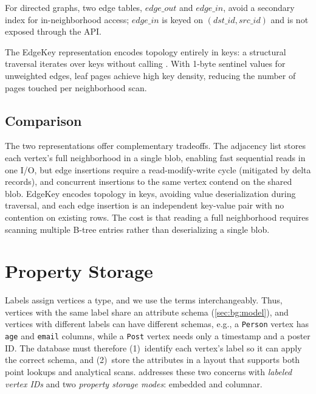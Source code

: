 For directed graphs, two edge tables, $edge\_out$ and $edge\_in$, avoid a secondary index for in-neighborhood access; $edge\_in$ is keyed on $(dst\_id, src\_id)$ and is not exposed through the API.


The EdgeKey representation encodes topology entirely in keys: a structural traversal iterates over keys without calling .
With 1-byte sentinel values for unweighted edges, leaf pages achieve high key density, reducing the number of pages touched per neighborhood scan.



\subsection{Comparison}
The two representations offer complementary tradeoffs.
The adjacency list stores each vertex's full neighborhood in a single blob, enabling fast sequential reads in one I/O, but edge insertions require a read-modify-write cycle (mitigated by  delta records), and concurrent insertions to the same vertex contend on the shared blob.
EdgeKey encodes topology in keys, avoiding value deserialization during traversal, and each edge insertion is an independent key-value pair with no contention on existing rows.
The cost is that reading a full neighborhood requires scanning multiple B-tree entries rather than deserializing a single blob.



\section{Property Storage}
\label{arch:property-storage}
Labels assign vertices a type, and we use the terms interchangeably.
Thus, vertices with the same label share an attribute schema (\autoref{sec:bg:model}), and vertices with different labels can have different schemas, e.g., a \texttt{Person} vertex has \texttt{age} and \texttt{email} columns, while a \texttt{Post} vertex needs only a timestamp and a poster ID.
The database must therefore (1)~identify each vertex's label so it can apply the correct schema, and (2)~store the attributes in a layout that supports both point lookups and analytical scans.
\project{} addresses these two concerns with \emph{labeled vertex IDs} and two \emph{property storage modes}: embedded and columnar.
